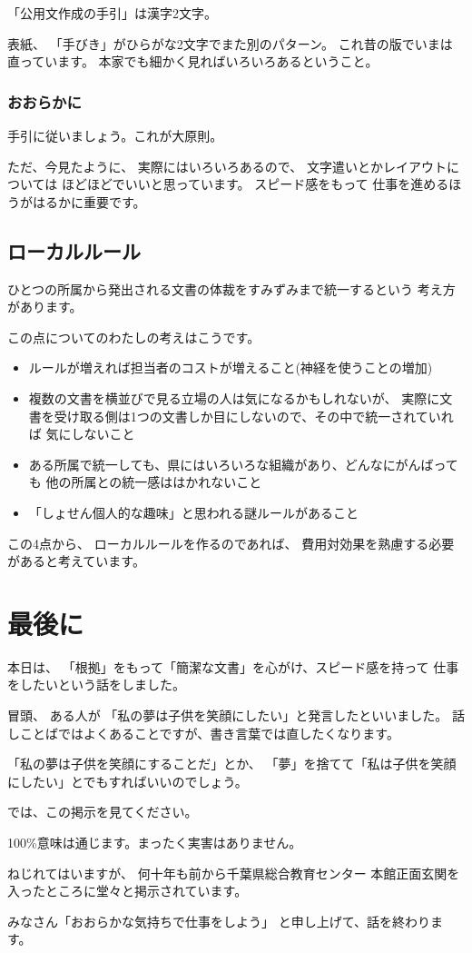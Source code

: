 \documentclass[uplatex,jis2004,dvipdfmx,12pt]{jsarticle}
\begin{document}
「公用文作成の手引」は漢字2文字。


表紙、
「手びき」がひらがな2文字でまた別のパターン。
これ昔の版でいまは直っています。
本家でも細かく見ればいろいろあるということ。


\subsubsection{おおらかに}
手引に従いましょう。これが大原則。

ただ、今見たように、
実際にはいろいろあるので、
文字遣いとかレイアウトについては
ほどほどでいいと思っています。
スピード感をもって
仕事を進めるほうがはるかに重要です。


\subsection{ローカルルール}

ひとつの所属から発出される文書の体裁をすみずみまで統一するという
考え方があります。

この点についてのわたしの考えはこうです。

\begin{itemize}
\item ルールが増えれば担当者のコストが増えること(神経を使うことの増加)
\item 複数の文書を横並びで見る立場の人は気になるかもしれないが、
実際に文書を受け取る側は1つの文書しか目にしないので、その中で統一されていれば
気にしないこと
\item ある所属で統一しても、県にはいろいろな組織があり、どんなにがんばっても
他の所属との統一感ははかれないこと
\item 「しょせん個人的な趣味」と思われる謎ルールがあること
\end{itemize}

この4点から、
ローカルルールを作るのであれば、
費用対効果を熟慮する必要があると考えています。



\section{最後に}
本日は、
「根拠」をもって「簡潔な文書」を心がけ、スピード感を持って
仕事をしたいという話をしました。

冒頭、
ある人が
「私の夢は子供を笑顔にしたい」と発言したといいました。
話しことばではよくあることですが、書き言葉では直したくなります。

「私の夢は子供を笑顔にすることだ」とか、
「夢」を捨てて「私は子供を笑顔にしたい」とでもすればいいのでしょう。

では、この掲示を見てください。

100\%意味は通じます。まったく実害はありません。

ねじれてはいますが、
何十年も前から千葉県総合教育センター
本館正面玄関を入ったところに堂々と掲示されています。

みなさん「おおらかな気持ちで仕事をしよう」
と申し上げて、話を終わります。
\end{document}
